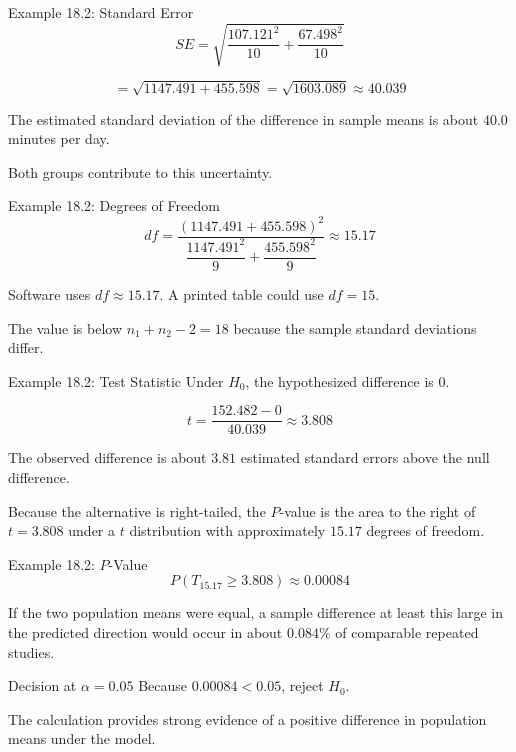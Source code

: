 \documentclass[aspectratio=169,10pt]{beamer}
\begin{document}
\begin{frame}{Example 18.2: Standard Error}
\small
\[
SE=
\sqrt{\frac{107.121^2}{10}+\frac{67.498^2}{10}}
\]

\[
=\sqrt{1147.491+455.598}
=\sqrt{1603.089}
\approx40.039
\]
\normalsize

The estimated standard deviation of the difference in sample means is about $40.0$ minutes per day.

Both groups contribute to this uncertainty.
\end{frame}

\begin{frame}{Example 18.2: Degrees of Freedom}
\scriptsize
\[
df=
\frac{(1147.491+455.598)^2}
{\dfrac{1147.491^2}{9}+\dfrac{455.598^2}{9}}
\approx15.17
\]
\normalsize

Software uses $df\approx15.17$. A printed table could use $df=15$.

The value is below $n_1+n_2-2=18$ because the sample standard deviations differ.
\end{frame}

\begin{frame}{Example 18.2: Test Statistic}
Under $H_0$, the hypothesized difference is $0$.

\[
t=
\frac{152.482-0}{40.039}
\approx3.808
\]

The observed difference is about $3.81$ estimated standard errors above the null difference.

Because the alternative is right-tailed, the $P$-value is the area to the right of $t=3.808$ under a $t$ distribution with approximately $15.17$ degrees of freedom.
\end{frame}

\begin{frame}{Example 18.2: $P$-Value}
\[
P(T_{15.17}\ge3.808)\approx0.00084
\]

If the two population means were equal, a sample difference at least this large in the predicted direction would occur in about $0.084\%$ of comparable repeated studies.

\begin{block}{Decision at $\alpha=0.05$}
Because $0.00084<0.05$, reject $H_0$.
\end{block}

The calculation provides strong evidence of a positive difference in population means under the model.
\end{frame}
\end{document}
